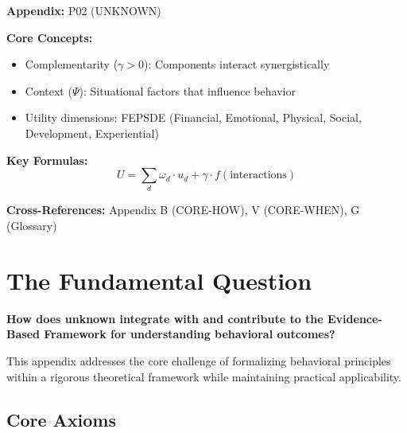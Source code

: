 \begin{tcolorbox}[colback=blue!5!white, colframe=blue!75!black,
    title=Quick Reference: Unknown]

\textbf{Appendix:} P02 (UNKNOWN)

\textbf{Core Concepts:}
\begin{itemize}[nosep]
\item Complementarity ($\gamma > 0$): Components interact synergistically
\item Context ($\Psi$): Situational factors that influence behavior
\item Utility dimensions: FEPSDE (Financial, Emotional, Physical, Social, Development, Experiential)
\end{itemize}

\textbf{Key Formulas:}
\begin{equation}
U = \sum_d \omega_d \cdot u_d + \gamma \cdot f(\text{interactions})
\end{equation}

\textbf{Cross-References:} Appendix B (CORE-HOW), V (CORE-WHEN), G (Glossary)
\end{tcolorbox}

\section{The Fundamental Question}
\label{sec:p02-fundamental}

\begin{tcolorbox}[
    colback=red!5!white,
    colframe=red!75!black,
    title={\textbf{Fundamental Question}}
]
\textbf{How does unknown integrate with and contribute to the
Evidence-Based Framework for understanding behavioral outcomes?}

This appendix addresses the core challenge of formalizing behavioral principles
within a rigorous theoretical framework while maintaining practical applicability.
\end{tcolorbox}


\subsection{Core Axioms}
\label{sec:p02-axioms}

